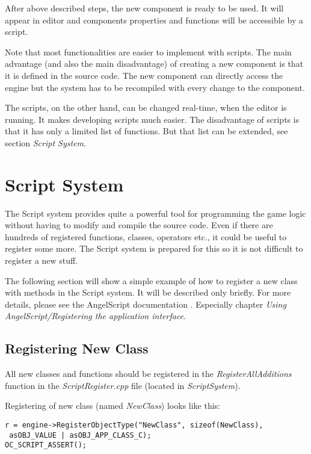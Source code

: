 \documentclass[a4paper, 12pt]{report}
\begin{document}
After above described steps, the new component is ready to be used. It will appear in editor and components properties and functions will be accessible by a script.

Note that most functionalities are easier to implement with scripts. The main advantage (and also the main disadvantage) of creating a new component is that it is defined in the source code. The new component can directly access the engine but the system has to be recompiled with every change to the component. 

The scripts, on the other hand, can be changed real-time, when the editor is running. It makes developing scripts much easier. The disadvantage of scripts is that it has only a limited list of functions. But that list can be extended, see section \emph{Script System}.

\chapter{Script System}

The Script system provides quite a powerful tool for programming the game logic without having to modify and compile the source code. Even if there are hundreds of registered functions, classes, operators etc., it could be useful to register some more. The Script system is prepared for this so it is not difficult to register a new stuff.

The following section will show a simple example of how to register a new class with methods in the Script system. It will be described only briefly. For more details, please see the AngelScript documentation \cite{angelscript}. Especially chapter \emph{Using AngelScript/Registering the application interface}.

\section{Registering New Class}

All new classes and functions should be registered in the \emph{RegisterAllAdditions} function in the \emph{ScriptRegister.cpp} file (located in \emph{ScriptSystem}).

Registering of new class (named \emph{NewClass}) looks like this:

\footnotesize 
\begin{verbatim}
r = engine->RegisterObjectType("NewClass", sizeof(NewClass),
 asOBJ_VALUE | asOBJ_APP_CLASS_C);
OC_SCRIPT_ASSERT();
\end{verbatim}
\normalsize
\end{document}
